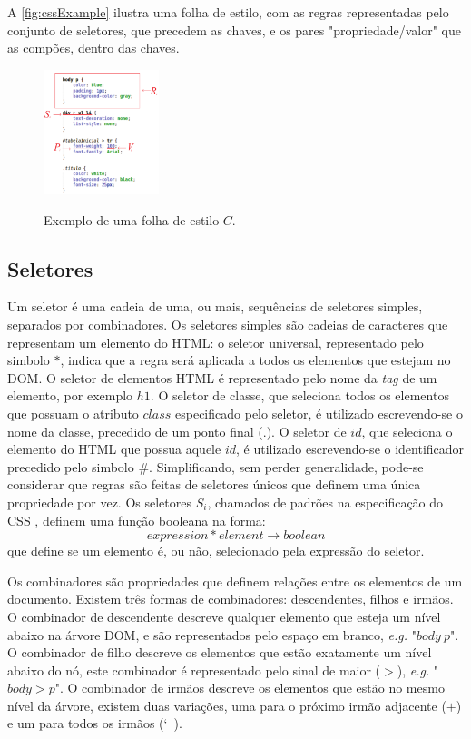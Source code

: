 A \autoref{fig:cssExample} ilustra uma folha de estilo, com as regras representadas pelo conjunto de seletores, que precedem as chaves, e os pares "propriedade/valor" que as compões, dentro das chaves.

\begin{figure}[!htb]
	\centering
	\caption{Exemplo de uma folha de estilo $C$.}
	\includegraphics[width=0.3\textwidth]{./04-figuras/css_example_marked}
	\label{fig:cssExample}
\end{figure}

\subsection{Seletores}
\label{subsec:seletores}
Um seletor é uma cadeia de uma, ou mais, sequências de seletores simples, separados por combinadores. Os seletores simples são cadeias de caracteres que representam um elemento do HTML: o seletor universal, representado pelo simbolo \(\ast\), indica que a regra será aplicada a todos os elementos que estejam no DOM. O seletor de elementos HTML é representado pelo nome da \textit{tag} de um elemento, por exemplo \(h1\). O seletor de classe, que seleciona todos os elementos que possuam o atributo \(class\) especificado pelo seletor, é utilizado escrevendo-se o nome da classe,  precedido de um ponto final (\(.\)). O seletor de \(id\), que seleciona o elemento do HTML que possua aquele \(id\), é utilizado escrevendo-se o identificador precedido pelo simbolo \(\#\). 
Simplificando, sem perder generalidade, pode-se considerar que regras são feitas de seletores únicos que definem uma única propriedade por vez. Os seletores \(S_i\), chamados de padrões na especificação do CSS \cite{CSSspec2009}, definem uma função booleana na forma:
\begin{equation}
	expression * element \rightarrow boolean
\end{equation}
que define se um elemento é, ou não, selecionado pela expressão do seletor.

Os combinadores são propriedades que definem relações entre os elementos de um documento. Existem três formas de combinadores: descendentes, filhos e irmãos. O combinador de descendente descreve qualquer elemento que esteja um nível abaixo na árvore DOM, e são representados pelo espaço em branco, \textit{e.g.} "$body\ p$". O combinador de filho descreve os elementos que estão exatamente um nível abaixo do nó, este combinador é representado pelo sinal de maior ($>$), \textit{e.g.} "$body > p$". O combinador de irmãos descreve os elementos que estão no mesmo nível da árvore, existem duas variações, uma para o próximo irmão adjacente ($+$) e um para todos os irmãos (\char`~).

